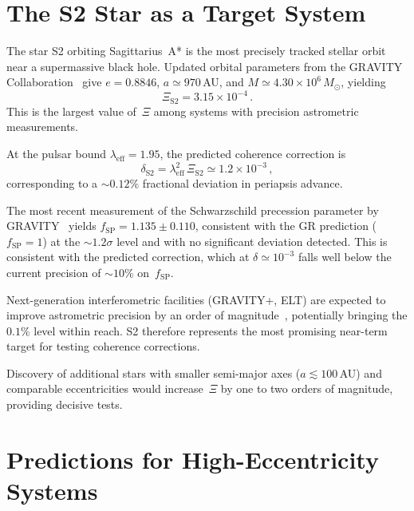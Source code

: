 \documentclass[showpacs,preprintnumbers,amsmath,amssymb,prd,longbibliography]{revtex4-2}
\begin{document}
\section{The S2 Star as a Target System}
\label{sec:S2}

The star S2 orbiting Sagittarius~A* is the most
precisely tracked stellar orbit near a supermassive
black hole.
Updated orbital parameters from the GRAVITY
Collaboration~\cite{GRAVITY2024} give
$e = 0.8846$, $a \simeq 970\,$AU, and
$M \simeq 4.30\times10^6\,M_\odot$, yielding
\begin{equation}
\Xi_{\mathrm{S2}} = 3.15 \times 10^{-4}\,.
\end{equation}
This is the largest value of~$\Xi$ among systems with
precision astrometric measurements.

At the pulsar bound $\lambda_{\mathrm{eff}} = 1.95$,
the predicted coherence correction is
\begin{equation}
\delta_{\mathrm{S2}} = \lambda_{\mathrm{eff}}^2\,\Xi_{\mathrm{S2}}
\simeq 1.2 \times 10^{-3}\,,
\end{equation}
corresponding to a $\sim 0.12\%$ fractional deviation in
periapsis advance.

The most recent measurement of the Schwarzschild precession
parameter by GRAVITY~\cite{GRAVITY2024} yields
$f_{\mathrm{SP}} = 1.135 \pm 0.110$, consistent with the
GR prediction ($f_{\mathrm{SP}} = 1$) at the $\sim 1.2\sigma$
level and with no significant deviation detected.
This is consistent with the predicted correction, which at
$\delta \simeq 10^{-3}$ falls well below the current
precision of $\sim 10\%$ on~$f_{\mathrm{SP}}$.

Next-generation interferometric facilities (GRAVITY+, ELT)
are expected to improve astrometric precision by an order of
magnitude~\cite{GRAVITY2022}, potentially bringing the
$0.1\%$ level within reach.
S2 therefore represents the most promising near-term target for
testing coherence corrections.

Discovery of additional stars with smaller semi-major axes
($a \lesssim 100\,$AU) and comparable eccentricities would
increase~$\Xi$ by one to two orders of magnitude,
providing decisive tests.

\section{Predictions for High-Eccentricity Systems}
\label{sec:predictions}
\end{document}
